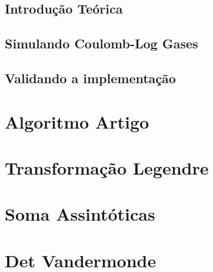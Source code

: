 \documentclass[11pt,oneside,a4paper]{report}
\begin{document}
\section{Introdução Teórica}


\section{Simulando Coulomb-Log Gases}


\section{Validando a implementação}


{}


\appendix

\chapter{Algoritmo Artigo}
\label{apdx: codeArtAlg}



\chapter{Transformação Legendre}
\label{apdx: legendre}


\chapter{Soma Assintóticas}
\label{apdx: somaassin}


\chapter{Det Vandermonde}
\label{apdx: vandermonde}

\end{document}
